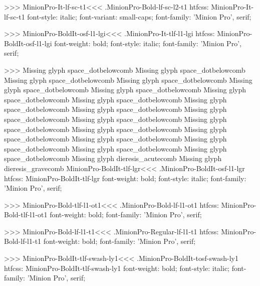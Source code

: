 {>>>
\<MinionPro-It-lf-sc-t1\><<<
.MinionPro-Bold-lf-sc-l2-t1
htfcss:  MinionPro-It-lf-sc-t1  font-style: italic; font-variant: small-caps; font-family: 'Minion Pro', serif;

>>>
\<MinionPro-BoldIt-osf-l1-lgi\><<<
.MinionPro-It-tlf-l1-lgi
htfcss:  MinionPro-BoldIt-osf-l1-lgi  font-weight: bold; font-style: italic; font-family: 'Minion Pro', serif;

>>>
Missing glyph	space_dotbelowcomb
Missing glyph	space_dotbelowcomb
Missing glyph	space_dotbelowcomb
Missing glyph	space_dotbelowcomb
Missing glyph	space_dotbelowcomb
Missing glyph	space_dotbelowcomb
Missing glyph	space_dotbelowcomb
Missing glyph	space_dotbelowcomb
Missing glyph	space_dotbelowcomb
Missing glyph	space_dotbelowcomb
Missing glyph	space_dotbelowcomb
Missing glyph	space_dotbelowcomb
Missing glyph	space_dotbelowcomb
Missing glyph	space_dotbelowcomb
Missing glyph	space_dotbelowcomb
Missing glyph	space_dotbelowcomb
Missing glyph	space_dotbelowcomb
Missing glyph	space_dotbelowcomb
Missing glyph	space_dotbelowcomb
Missing glyph	dieresis_acutecomb
Missing glyph	dieresis_gravecomb
\<MinionPro-BoldIt-tlf-lgr\><<<
.MinionPro-BoldIt-osf-l1-lgr
htfcss:  MinionPro-BoldIt-tlf-lgr  font-weight: bold; font-style: italic; font-family: 'Minion Pro', serif;

>>>
\<MinionPro-Bold-tlf-l1-ot1\><<<
.MinionPro-Bold-lf-l1-ot1
htfcss:  MinionPro-Bold-tlf-l1-ot1  font-weight: bold; font-family: 'Minion Pro', serif;

>>>
\<MinionPro-Bold-lf-l1-t1\><<<
.MinionPro-Regular-lf-l1-t1
htfcss:  MinionPro-Bold-lf-l1-t1  font-weight: bold; font-family: 'Minion Pro', serif;

>>>
\<MinionPro-BoldIt-tlf-swash-ly1\><<<
.MinionPro-BoldIt-tosf-swash-ly1
htfcss:  MinionPro-BoldIt-tlf-swash-ly1  font-weight: bold; font-style: italic; font-family: 'Minion Pro', serif;

}
